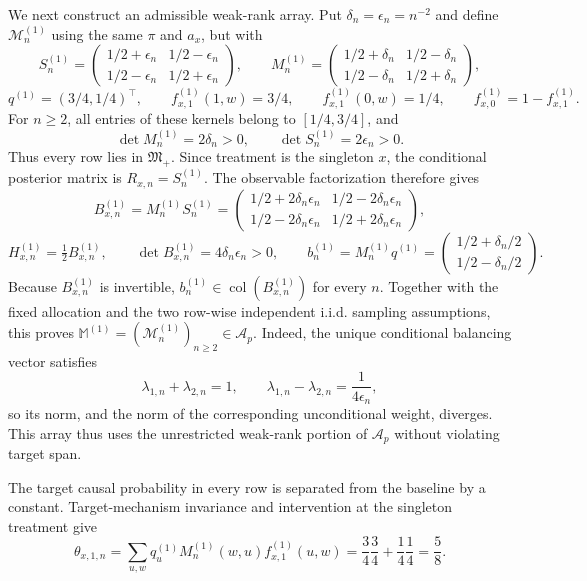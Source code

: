 We next construct an admissible weak-rank array. Put \(\delta_n=\epsilon_n=n^{-2}\) and define \(\mathcal M^{(1)}_n\) using the same \(\pi\) and \(a_x\), but with
\[
S^{(1)}_n=
\begin{pmatrix}
1/2+\epsilon_n&1/2-\epsilon_n\\
1/2-\epsilon_n&1/2+\epsilon_n
\end{pmatrix},\qquad
M^{(1)}_n=
\begin{pmatrix}
1/2+\delta_n&1/2-\delta_n\\
1/2-\delta_n&1/2+\delta_n
\end{pmatrix},
\]
\[
q^{(1)}=(3/4,1/4)^{\top},\qquad
f^{(1)}_{x,1}(1,w)=3/4,\qquad
f^{(1)}_{x,1}(0,w)=1/4,
\qquad f^{(1)}_{x,0}=1-f^{(1)}_{x,1}.
\]
For \(n\ge2\), all entries of these kernels belong to \([1/4,3/4]\), and
\[
\det M^{(1)}_n=2\delta_n>0,
\qquad
\det S^{(1)}_n=2\epsilon_n>0.
\]
Thus every row lies in \(\mathfrak M_{+}\). Since treatment is the singleton \(x\), the conditional posterior matrix is \(R_{x,n}=S^{(1)}_n\). The observable factorization therefore gives
\[
B^{(1)}_{x,n}=M^{(1)}_nS^{(1)}_n=
\begin{pmatrix}
1/2+2\delta_n\epsilon_n&1/2-2\delta_n\epsilon_n\\
1/2-2\delta_n\epsilon_n&1/2+2\delta_n\epsilon_n
\end{pmatrix},
\]
\[
H^{(1)}_{x,n}=\tfrac12B^{(1)}_{x,n},\qquad
\det B^{(1)}_{x,n}=4\delta_n\epsilon_n>0,
\qquad
b^{(1)}_n=M^{(1)}_nq^{(1)}=
\begin{pmatrix}1/2+\delta_n/2\\1/2-\delta_n/2\end{pmatrix}.
\]
Because \(B^{(1)}_{x,n}\) is invertible, \(b^{(1)}_n\in\operatorname{col}(B^{(1)}_{x,n})\) for every \(n\). Together with the fixed allocation and the two row-wise independent i.i.d. sampling assumptions, this proves \(\mathbb M^{(1)}=(\mathcal M^{(1)}_n)_{n\ge2}\in\mathcal A_p\). Indeed, the unique conditional balancing vector satisfies
\[
\lambda_{1,n}+\lambda_{2,n}=1,
\qquad
\lambda_{1,n}-\lambda_{2,n}=\frac{1}{4\epsilon_n},
\]
so its norm, and the norm of the corresponding unconditional weight, diverges. This array thus uses the unrestricted weak-rank portion of \(\mathcal A_p\) without violating target span.

The target causal probability in every row is separated from the baseline by a constant. Target-mechanism invariance and intervention at the singleton treatment give
\[
\theta_{x,1,n}
=\sum_{u,w}q^{(1)}_uM^{(1)}_n(w,u)f^{(1)}_{x,1}(u,w)
=\frac34\frac34+\frac14\frac14
=\frac58.
\]

